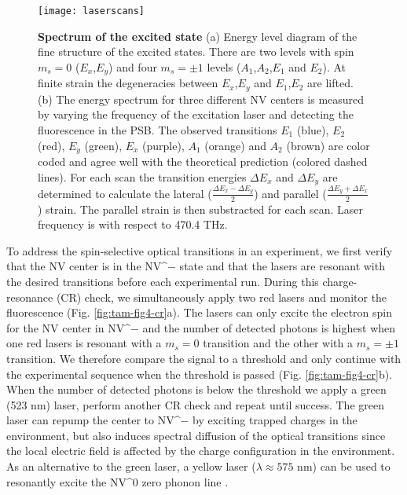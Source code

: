 \begin{figure*}
	\centering
	\texttt{[image: laserscans]}
	\caption{\label{fig:tam-fig4-laserscan} \textbf{Spectrum of the excited state} (a) Energy level diagram of the fine structure of the excited states. There are two levels with spin $m_s = 0$ ($E_x$,$E_y$) and four $m_s = \pm 1$ levels ($A_1$,$A_2$,$E_1$ and $E_2$). At finite strain the degeneracies between $E_x$,$E_y$ and $E_1$,$E_2$ are lifted. (b) The energy spectrum for three different NV centers is measured by varying the frequency of the excitation laser and detecting the fluorescence in the PSB. The observed transitions $E_1$ (blue), $E_2$ (red), $E_y$ (green), $E_x$ (purple), $A_1$ (orange) and $A_2$ (brown) are color coded and agree well with the theoretical prediction (colored dashed lines). For each scan the transition energies $\Delta E_x$ and $\Delta E_y$ are determined to calculate the lateral ($\frac{\Delta E_x-\Delta E_y}{2}$) and parallel ($\frac{\Delta E_y+\Delta E_x}{2}$) strain. The parallel strain is then substracted for each scan. Laser frequency is with respect to 470.4 THz.}
\end{figure*}

To address the spin-selective optical transitions in an experiment, we first verify that the NV center is in the NV^$-$ state and that the lasers are resonant with the desired transitions before each experimental run. During this charge-resonance (CR) check, we simultaneously apply two red lasers and monitor the fluorescence (Fig. \ref{fig:tam-fig4-cr}a). The lasers can only excite the electron spin for the NV center in NV^$-$ and the number of detected photons is highest when one red lasers is resonant with a $m_s = 0$ transition and the other with a $m_s=\pm1$ transition. We therefore compare the signal to a threshold and only continue with the experimental sequence when the threshold is passed (Fig. \ref{fig:tam-fig4-cr}b). When the number of detected photons is below the threshold we apply a green (523 nm) laser, perform another CR check and repeat until success. The green laser can repump the center to NV^$-$ by exciting trapped charges in the environment, but also induces spectral diffusion of the optical transitions since the local electric field is affected by the charge configuration in the environment. As an alternative to the green laser, a yellow laser ($\lambda \approx 575$ nm) can be used to resonantly excite the NV^$0$ zero phonon line \cite{Siyushev_Phys.Rev.Lett._2013}. 

